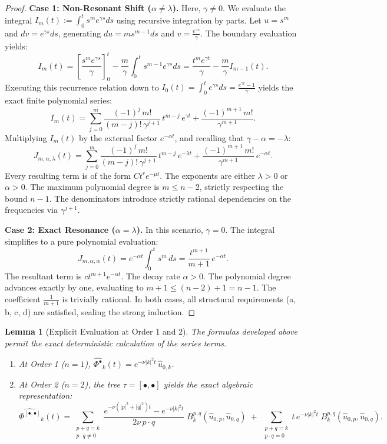 \documentclass[12pt,a4paper]{article}
\theoremstyle{plain}
\newtheorem{lemma}[theorem]{Lemma}
\theoremstyle{definition}
\theoremstyle{remark}
\begin{document}
\begin{proof}
\textbf{Case 1: Non-Resonant Shift ($\alpha \neq \lambda$).} Here, $\gamma \neq 0$. We evaluate the integral $I_m(t) := \int_0^t s^m e^{\gamma s} ds$ using recursive integration by parts. Let $u = s^m$ and $dv = e^{\gamma s} ds$, generating $du = m s^{m-1} ds$ and $v = \frac{e^{\gamma s}}{\gamma}$. The boundary evaluation yields:
\[
  I_m(t) = \left[ \frac{s^m e^{\gamma s}}{\gamma} \right]_0^t - \frac{m}{\gamma} \int_0^t s^{m-1} e^{\gamma s} ds = \frac{t^m e^{\gamma t}}{\gamma} - \frac{m}{\gamma} I_{m-1}(t).
\]
Executing this recurrence relation down to $I_0(t) = \int_0^t e^{\gamma s} ds = \frac{e^{\gamma t}-1}{\gamma}$ yields the exact finite polynomial series:
\[
  I_m(t) = \sum_{j=0}^{m} \frac{(-1)^j\,m!}{(m-j)!\,\gamma^{j+1}}\, t^{m-j}\,e^{\gamma t} + \frac{(-1)^{m+1}\,m!}{\gamma^{m+1}}.
\]
Multiplying $I_m(t)$ by the external factor $e^{-\alpha t}$, and recalling that $\gamma - \alpha = -\lambda$:
\[
  J_{m,\alpha,\lambda}(t) = \sum_{j=0}^m \frac{(-1)^j\,m!}{(m-j)!\,\gamma^{j+1}}\,t^{m-j}\,e^{-\lambda t} + \frac{(-1)^{m+1}\,m!}{\gamma^{m+1}}\,e^{-\alpha t}.
\]
Every resulting term is of the form $C t^r e^{-\mu t}$. The exponents are either $\lambda > 0$ or $\alpha > 0$. The maximum polynomial degree is $m \le n-2$, strictly respecting the bound $n-1$. The denominators introduce strictly rational dependencies on the frequencies via $\gamma^{j+1}$.

\textbf{Case 2: Exact Resonance ($\alpha = \lambda$).} In this scenario, $\gamma = 0$. The integral simplifies to a pure polynomial evaluation:
\[
  J_{m,\alpha,\alpha}(t) = e^{-\alpha t}\int_0^t s^m\,ds = \frac{t^{m+1}}{m+1}\,e^{-\alpha t}.
\]
The resultant term is $c t^{m+1} e^{-\alpha t}$. The decay rate $\alpha > 0$. The polynomial degree advances exactly by one, evaluating to $m+1 \le (n-2) + 1 = n-1$. The coefficient $\frac{1}{m+1}$ is trivially rational. 
In both cases, all structural requirements (a, b, c, d) are satisfied, sealing the strong induction.
\end{proof}

\begin{lemma}[Explicit Evaluation at Order 1 and 2]
\label{lem:explicit_evaluation}
The formulas developed above permit the exact deterministic calculation of the series terms. 
\begin{enumerate}
  \item At Order 1 ($n=1$), $\widehat{\Phi^\bullet}_k(t) = e^{-\nu|k|^2 t}\,\hat{u}_{0,k}$.
  \item At Order 2 ($n=2$), the tree $\tau = [\bullet,\bullet]$ yields the exact algebraic representation:
  \[
    \widehat{\Phi^{[\bullet,\bullet]}}_k(t)
    = \sum_{\substack{p+q=k\\p\cdot q\neq 0}} \frac{e^{-\nu(|p|^2+|q|^2)t}-e^{-\nu|k|^2 t}}{2\nu\,p\cdot q}\; B_k^{p,q}(\hat{u}_{0,p},\hat{u}_{0,q})
    \;+\;
    \sum_{\substack{p+q=k\\p\cdot q=0}} t\,e^{-\nu|k|^2 t}\; B_k^{p,q}(\hat{u}_{0,p},\hat{u}_{0,q}).
  \]
\end{enumerate}
\end{lemma}
\end{document}
